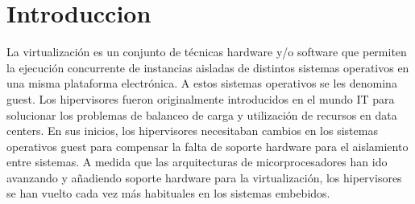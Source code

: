 \section{Introduccion}
\label{ch:introduccion:primera}
La virtualización es un conjunto de técnicas hardware y/o software que permiten la ejecución
concurrente de instancias aisladas de distintos sistemas operativos en una misma plataforma
electrónica. A estos sistemas operativos se les denomina guest.
Los hipervisores fueron originalmente introducidos en el mundo IT para solucionar los problemas de
balanceo de carga y utilización de recursos en data centers. En sus inicios, los hipervisores necesitaban cambios en
los sistemas operativos guest para compensar la falta de soporte hardware para el aislamiento
entre sistemas. A medida que las arquitecturas de micorprocesadores han ido avanzando y añadiendo
soporte hardware para la virtualización, los hipervisores se han vuelto cada vez más habituales en los
sistemas embebidos.

